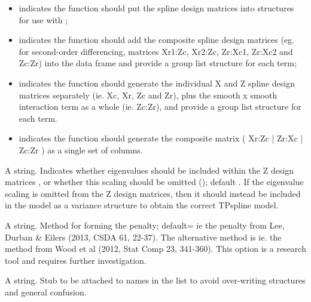 \documentclass[a4paper]{book}
\begin{document}
\begin{Arguments}
\begin{ldescription}
\begin{itemize}
\item{}  indicates the function should put the
spline design matrices into structures for use with ;
\item{}  indicates the function should add the
composite spline design matrices (eg. for second-order differencing,
matrices Xr1:Zc, Xr2:Zc, Zr:Xc1, Zr:Xc2 and Zc:Zr) into the data frame
and provide a group list structure for each term;
\item{}  indicates the function should generate the
individual X and Z spline design matrices separately (ie. Xc, Xr, Zc and
Zr), plus the smooth x smooth interaction term as a whole (ie. Zc:Zr),
and provide a group list structure for each term.
\item{}  indicates the function should generate the
composite matrix ( Xr:Zc | Zr:Xc | Zc:Zr ) as a single set of columns.

\end{itemize}


\item[\code{eigenvalues}] A string. Indicates whether eigenvalues should be
included within the Z design matrices , or
whether this scaling should be omitted ();
default . If the eigenvalue scaling is
omitted from the Z design matrices, then it should instead be included in
the model as a variance structure to obtain the correct TPspline model.

\item[\code{method}] A string. Method for forming the  penalty; default=
ie the penalty from Lee, Durban \& Eilers (2013, CSDA 61, 22-37). The
alternative method is  ie. the method from Wood et al (2012,
Stat Comp 23, 341-360).
This option is a research tool and requires further investigation.

\item[\code{stub}] A string. Stub to be attached to names in the  list to
avoid over-writing structures and general confusion.
\end{ldescription}
\end{Arguments}
%
\end{document}
